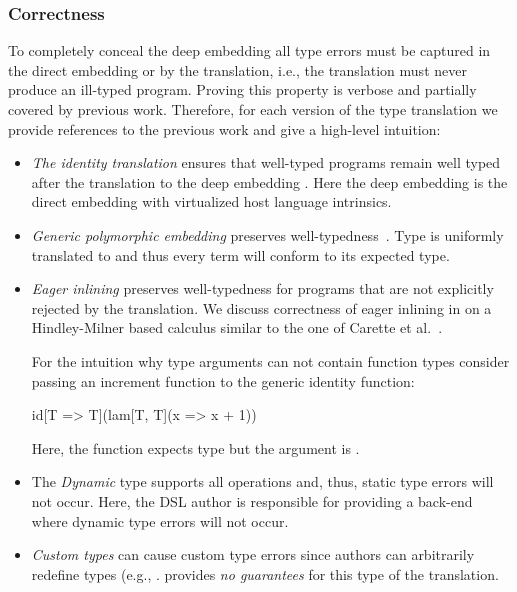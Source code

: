 \subsubsection{Correctness}
\label{sec:correctness}
To completely conceal the deep embedding all type errors must be captured in the direct embedding or by the translation, i.e., the translation must never produce an ill-typed program. Proving this property is verbose and partially covered by previous work. Therefore, for each version of the type translation we provide references to the previous work and give a high-level intuition:
\begin{itemize}

\item \emph{The identity translation} ensures that well-typed programs remain
well typed after the translation to the deep embedding
\cite{carette_finally_2009}. Here the deep embedding is the direct embedding
with virtualized host language intrinsics.

\item \emph{Generic polymorphic embedding} preserves well-typedness~\cite{carette_finally_2009}.
 Type  is uniformly translated to  and thus every term will conform to its expected type.

\item \emph{Eager inlining} preserves well-typedness for programs that are
not explicitly rejected by the translation. We discuss correctness of eager inlining
in \cite{techrep} on a Hindley-Milner based calculus similar to the one of Carette et al.~\cite{carette_finally_2009}.

For the intuition why type arguments can not contain function types consider passing an increment function to the generic identity function:
\begin{listingtiny}
  id[T => T](lam[T, T](x => x + 1))
\end{listingtiny}
Here, the  function expects  type but the argument is .

\item The \emph{Dynamic} type supports all operations and, thus, static type errors will not occur. Here, the DSL author is responsible for providing a back-end where dynamic type errors will not occur.

\item \emph{Custom types} can cause custom type errors since \edsl authors can
arbitrarily redefine types (e.g., . \yy provides
\emph{no guarantees} for this type of the translation.

\end{itemize}


